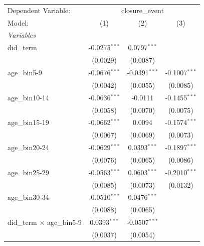 
\begingroup
\centering
\begin{tabular}{lccc}
   \tabularnewline \midrule \midrule
   Dependent Variable: & \multicolumn{3}{c}{closure\_event}\\
   Model:                                    & (1)             & (2)             & (3)\\  
   \midrule
   \emph{Variables}\\
   did\_term                                 & -0.0275$^{***}$ & 0.0797$^{***}$  &   \\   
                                             & (0.0029)        & (0.0087)        &   \\   
   age\_bin5-9                               & -0.0676$^{***}$ & -0.0391$^{***}$ & -0.1007$^{***}$\\   
                                             & (0.0042)        & (0.0055)        & (0.0085)\\   
   age\_bin10-14                             & -0.0636$^{***}$ & -0.0111         & -0.1455$^{***}$\\   
                                             & (0.0058)        & (0.0070)        & (0.0075)\\   
   age\_bin15-19                             & -0.0662$^{***}$ & 0.0094          & -0.1574$^{***}$\\   
                                             & (0.0067)        & (0.0069)        & (0.0073)\\   
   age\_bin20-24                             & -0.0629$^{***}$ & 0.0393$^{***}$  & -0.1897$^{***}$\\   
                                             & (0.0076)        & (0.0065)        & (0.0086)\\   
   age\_bin25-29                             & -0.0563$^{***}$ & 0.0603$^{***}$  & -0.2010$^{***}$\\   
                                             & (0.0085)        & (0.0073)        & (0.0132)\\   
   age\_bin30-34                             & -0.0510$^{***}$ & 0.0476$^{***}$  &   \\   
                                             & (0.0088)        & (0.0065)        &   \\   
   did\_term $\times$ age\_bin5-9            & 0.0393$^{***}$  & -0.0507$^{***}$ &   \\   
                                             & (0.0037)        & (0.0054)        &   \\   

\end{tabular}
